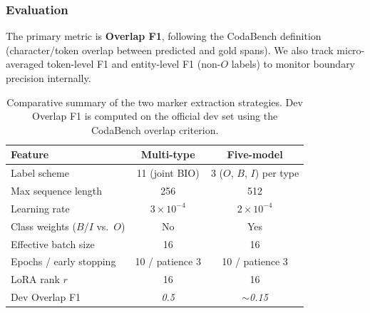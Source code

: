 \subsubsection{Evaluation}

The primary metric is \textbf{Overlap F1}, following the CodaBench definition (character/token overlap between predicted and gold spans). We also track micro-averaged token-level F1 and entity-level F1 (non-$O$ labels) to monitor boundary precision internally.

\begin{table}[ht]
    \centering
    \small
    \renewcommand{\arraystretch}{1.35}
    \begin{tabular}{l cc}
        \hline
        \textbf{Feature} & \textbf{Multi-type} & \textbf{Five-model} \\
        \hline
        Label scheme & 11 (joint BIO) & 3 ($O$, $B$, $I$) per type \\
        Max sequence length & 256 & 512 \\
        Learning rate & $3\times10^{-4}$ & $2\times10^{-4}$ \\
        Class weights ($B$/$I$ vs.\ $O$) & No & Yes \\
        Effective batch size & 16 & 16 \\
        Epochs / early stopping & 10 / patience 3 & 10 / patience 3 \\
        LoRA rank $r$ & 16 & 16 \\
        \hline
        Dev Overlap F1 & \textit{0.5} & \textit{$\sim$0.15} \\
        \hline
    \end{tabular}
    \caption{Comparative summary of the two marker extraction strategies. Dev Overlap F1 is computed on the official dev set using the CodaBench overlap criterion.}
    \label{tab:extraction_comparison}
\end{table}
